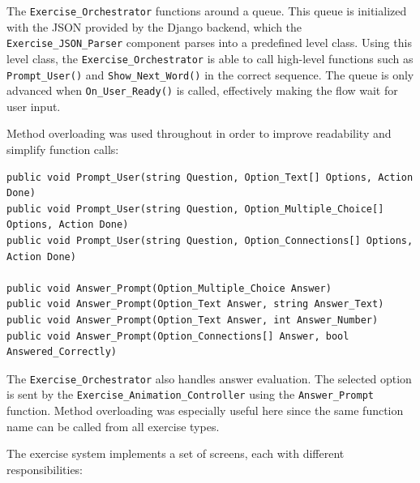 The \texttt{Exercise\_Orchestrator} functions around a queue. This queue is initialized with the JSON provided by the Django backend, which the \texttt{Exercise\_JSON\_Parser} component parses into a predefined level class. Using this level class, the \texttt{Exercise\_Orchestrator} is able to call high-level functions such as \texttt{Prompt\_User()} and \texttt{Show\_Next\_Word()} in the correct sequence. The queue is only advanced when \texttt{On\_User\_Ready()} is called, effectively making the flow wait for user input.

Method overloading was used throughout in order to improve readability and simplify function calls:

\begin{verbatim}
public void Prompt_User(string Question, Option_Text[] Options, Action Done)
public void Prompt_User(string Question, Option_Multiple_Choice[] Options, Action Done)
public void Prompt_User(string Question, Option_Connections[] Options, Action Done)

public void Answer_Prompt(Option_Multiple_Choice Answer)
public void Answer_Prompt(Option_Text Answer, string Answer_Text)
public void Answer_Prompt(Option_Text Answer, int Answer_Number)
public void Answer_Prompt(Option_Connections[] Answer, bool Answered_Correctly)
\end{verbatim}

The \texttt{Exercise\_Orchestrator} also handles answer evaluation. The selected option is sent by the \texttt{Exercise\_Animation\_Controller} using the \texttt{Answer\_Prompt} function. Method overloading was especially useful here since the same function name can be called from all exercise types.

The exercise system implements a set of screens, each with different responsibilities:

